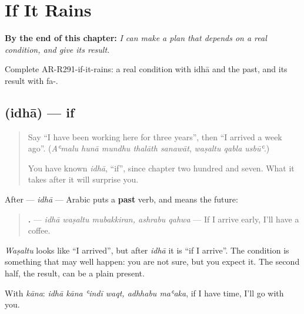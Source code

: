 
\chapter{If It Rains}
\label{ch:ar-if-it-rains}

\begin{chapteropening}
\textbf{By the end of this chapter:} \emph{I can make a plan that depends on a real condition, and give its result.}

Complete AR-R291-if-it-rains: a real condition with idhā and the past, and its result with fa-.
\end{chapteropening}

\section[\texorpdfstring{\ar{إذا} (idhā)}{إذا (idhā)}]{ (idhā) — if}

\label{lesson:AR-C291-idha}



\begin{quote}
Say \textquotedblleft{}I have been working here for three years\textquotedblright{}, then \textquotedblleft{}I arrived a week ago\textquotedblright{}. (\emph{Aʿmalu hunā mundhu thalāth sanawāt}, \emph{waṣaltu qabla usbūʿ}.)

You have known \emph{idhā}, \textquotedblleft{}if\textquotedblright{}, since chapter two hundred and seven. What it takes after it will surprise you.
\end{quote}

\begin{grammarlens}[title={Grammar Lens: idhā and the past}]
After \textbf{} — \emph{idhā} — Arabic puts a \textbf{past} verb, and means the future:

\begin{quote}
\textbf{    .} — \emph{idhā waṣaltu mubakkiran, ashrabu qahwa} — If I arrive early, I'll have a coffee.
\end{quote}

\emph{Waṣaltu} looks like \textquotedblleft{}I arrived\textquotedblright{}, but after \emph{idhā} it is \textquotedblleft{}if I arrive\textquotedblright{}. The condition is something that may well happen: you are not sure, but you expect it. The second half, the result, can be a plain present.

With \emph{kāna}: \emph{idhā kāna ʿindī waqt, adhhabu maʿaka}, if I have time, I'll go with you.
\end{grammarlens}


